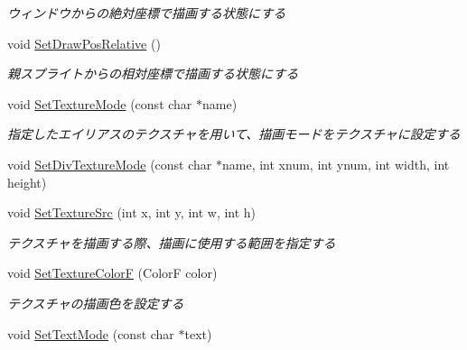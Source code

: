 \begin{DoxyCompactItemize}
\begin{DoxyCompactList}\small\item\em ウィンドウからの絶対座標で描画する状態にする \end{DoxyCompactList}\item 
void \hyperlink{class_sprite_aec55bcf3fcbe90a59e08c0adf3a7dd62}{Set\+Draw\+Pos\+Relative} ()\hypertarget{class_sprite_aec55bcf3fcbe90a59e08c0adf3a7dd62}{}\label{class_sprite_aec55bcf3fcbe90a59e08c0adf3a7dd62}

\begin{DoxyCompactList}\small\item\em 親スプライトからの相対座標で描画する状態にする \end{DoxyCompactList}\item 
void \hyperlink{class_sprite_a6dcfbb2e57eba1548dc5c244b993fe8a}{Set\+Texture\+Mode} (const char $\ast$name)\hypertarget{class_sprite_a6dcfbb2e57eba1548dc5c244b993fe8a}{}\label{class_sprite_a6dcfbb2e57eba1548dc5c244b993fe8a}

\begin{DoxyCompactList}\small\item\em 指定したエイリアスのテクスチャを用いて、描画モードをテクスチャに設定する \end{DoxyCompactList}\item 
void \hyperlink{class_sprite_a32c37cab456e545730d64c5b87757039}{Set\+Div\+Texture\+Mode} (const char $\ast$name, int xnum, int ynum, int width, int height)
\item 
void \hyperlink{class_sprite_a6a61fed0b01e45a727c79e2847b987c0}{Set\+Texture\+Src} (int x, int y, int w, int h)\hypertarget{class_sprite_a6a61fed0b01e45a727c79e2847b987c0}{}\label{class_sprite_a6a61fed0b01e45a727c79e2847b987c0}

\begin{DoxyCompactList}\small\item\em テクスチャを描画する際、描画に使用する範囲を指定する \end{DoxyCompactList}\item 
void \hyperlink{class_sprite_aa379c17355f7e4c2db4f4b83b12dadf7}{Set\+Texture\+ColorF} (ColorF color)\hypertarget{class_sprite_aa379c17355f7e4c2db4f4b83b12dadf7}{}\label{class_sprite_aa379c17355f7e4c2db4f4b83b12dadf7}

\begin{DoxyCompactList}\small\item\em テクスチャの描画色を設定する \end{DoxyCompactList}\item 
void \hyperlink{class_sprite_ac21f74c27e5470ab2bd54fdfe4de0e3a}{Set\+Text\+Mode} (const char $\ast$text)\hypertarget{class_sprite_ac21f74c27e5470ab2bd54fdfe4de0e3a}{}\label{class_sprite_ac21f74c27e5470ab2bd54fdfe4de0e3a}


\end{DoxyCompactItemize}
